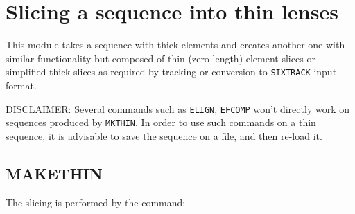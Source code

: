  
\chapter{Slicing a sequence into thin lenses}
\label{chap:makethin}

This module takes a sequence with thick elements and creates another one 
with similar functionality but composed of
thin (zero length) element slices or simplified thick slices as required
by \madx tracking or conversion to \texttt{SIXTRACK} input format.

DISCLAIMER: Several \madx commands such as {\texttt{ELIGN}}, {\texttt{EFCOMP}} won't directly work on sequences produced by {\texttt{MKTHIN}}. In order to use such commands on a thin sequence, it is advisable to save the sequence on a file, and then re-load it.

\section{MAKETHIN}
\label{sec:makethin}

The slicing is performed by the command: 

